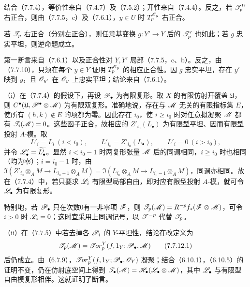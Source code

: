 结合（7.7.4），等价性来自（7.4.7）及（7.5.2）；开性来自（7.4.4）。反之，若 $\mathscr T_p^U$ 右正合，则由（7.7.5，c）及（7.6.1），$y\in U$ 时 $T_p^{\mathscr O_y}$ 右正合。

若 $\mathscr T_p$ 右正合（分别左正合），则任意基变换 $g:Y'\to Y$ 后的 $\mathscr T'_p$ 也如此；若 $g$ 忠实平坦，则逆命题成立。

第一断言来自（7.6.1）以及正合性对 $Y,Y'$ 局部（7.7.5，c、b）。反之，由（7.7.10），只须在每个 $y\in Y$ 证明 $T_p^{\mathscr O_y}$ 的相应正合性。因 $g$ 忠实平坦，存在 $y'$ 映到 $y$，且 $\mathscr O_{y'}$ 在 $\mathscr O_y$ 上忠实平坦；结论来自（7.6.1）。

（i）在（7.7.4）的假设下，再设 $\mathscr P_\bullet$ 为有限复形。取 $X$ 的有限仿射开覆盖 $\mathfrak U$，则 $C^\bullet(\mathfrak U,\mathscr P^\bullet\otimes\mathscr M)$ 为有限双复形。准确地说，存在与 $\mathscr M$ 无关的有限指标集 $E$，使所有 $(h,k)\notin E$ 的项都为零。因此存在 $i_0$，使 $i\geq i_0$ 时对任意拟凝聚 $\mathscr M$ 都有 $\mathscr T_i(\mathscr M)=0$。这些函子正合，故相应的 $Z'_{i_0}(L_\bullet)$ 为有限型平坦、因而有限型投射 $A$-模。取
\[
 L'_i=L_i\ (i<i_0),\qquad L'_{i_0}=Z'_{i_0}(L_\bullet),
 \qquad L'_i=0\ (i>i_0),
\]
并令 $\mathscr L'_\bullet=\widetilde{L'_\bullet}$。显然 $i<i_0-1$ 时两复形张量 $\mathscr M$ 后的同调相同，$i\geq i_0$ 时也相同（均为零）；$i=i_0-1$ 时，由 $\Im(Z'_{i_0}\otimes_A M\to L_{i_0-1}\otimes_A M)=\Im(L_{i_0}\otimes_A M\to L_{i_0-1}\otimes_A M)$，同调亦相同。故在（7.7.4）中，若只要求 $\mathscr L_i$ 有限型局部自由，即对应有限型投射 $A$-模，就可令 $\mathscr L_\bullet$ 为有限复形。

特别地，若 $\mathscr P_\bullet$ 只在次数0有一非零项 $\mathscr F$，则 $\mathscr T_p(\mathscr M)=R^{-p}f_*(\mathscr F\otimes\mathscr M)$，可令 $i>0$ 时 $\mathscr L_i=0$；这时宜采用上同调记号，以 $\mathscr T^{-p}$ 代替 $\mathscr T_p$。

（ii）在（7.7.5）中若去掉各 $\mathscr P_i$ 的 $Y$-平坦性，结论在改定义为
\begin{equation}
 \mathscr T_p(\mathscr M)=\mathscr{T}\!or_p^Y(f,1_Y;\mathscr P_\bullet,\mathscr M)\tag{7.7.12.1}
\end{equation}
后仍成立。由（6.7.9），$\mathscr{T}\!or_p^Y(f,1_Y;\mathscr P_\bullet,\mathscr O_Y)$ 凝聚；结合（6.10.1），（6.10.5）的证明不变，仍在仿射底空间上得到 $\mathscr T_\bullet(\mathscr M)=\mathscr H_\bullet(\mathscr L_\bullet\otimes\mathscr M)$，其中 $\mathscr L_\bullet$ 与有限型自由模复形相伴。这就证明了断言。

